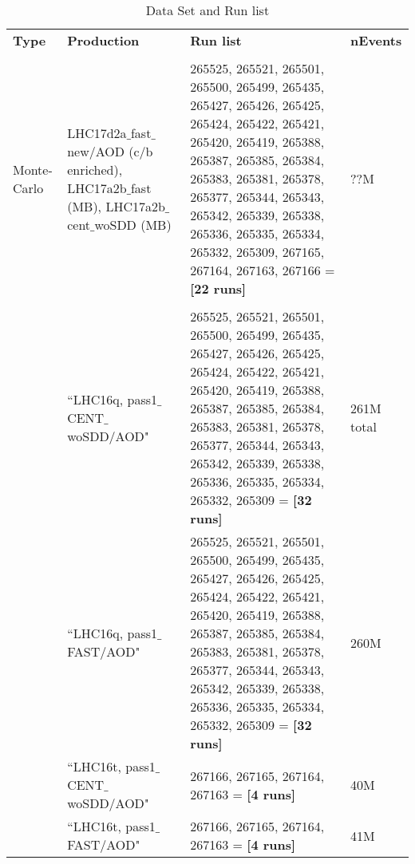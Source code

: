 \vspace{10 mm}
\begin{table}[h]
\begin{tabular}{ p{1.2cm} | p{4.2cm} |  p{7cm} |  p{1.2cm}}
{\normalsize \textbf {Type}} &       {\normalsize \textbf {Production}} &       {\normalsize \textbf {Run list}} & {\normalsize \textbf {nEvents}} \\
\\ \hline
Monte-Carlo & LHC17d2a$\_$fast$\_$new/AOD (c/b enriched), LHC17a2b$\_$fast (MB), LHC17a2b$\_$cent$\_$woSDD (MB) &265525, 265521, 265501, 265500, 265499, 265435, 265427, 265426, 265425, 265424, 265422, 265421, 265420, 265419, 265388, 265387, 265385, 265384, 265383, 265381, 265378, 265377, 265344, 265343, 265342, 265339, 265338, 265336, 265335, 265334, 265332, 265309, 267165, 267164, 267163, 267166 = \textbf{[22 runs]} & ??M\\
\\ \hline

\multirow{7}{*}{} Data&``LHC16q, pass1$\_$CENT$\_$woSDD/AOD" & 265525, 265521, 265501, 265500, 265499, 265435, 265427, 265426, 265425, 265424, 265422, 265421, 265420, 265419, 265388, 265387, 265385, 265384, 265383, 265381, 265378, 265377, 265344, 265343, 265342, 265339, 265338, 265336, 265335, 265334, 265332, 265309 = \textbf{[32 runs]}& 261M total\\
                  &``LHC16q, pass1$\_$FAST/AOD" &265525, 265521, 265501, 265500, 265499, 265435, 265427, 265426, 265425, 265424, 265422, 265421, 265420, 265419, 265388, 265387, 265385, 265384, 265383, 265381, 265378, 265377, 265344, 265343, 265342, 265339, 265338, 265336, 265335, 265334, 265332, 265309 = \textbf{[32 runs]} & 260M \\
 & ``LHC16t, pass1$\_$CENT$\_$woSDD/AOD" & 267166, 267165, 267164, 267163 = \textbf{[4 runs]} & 40M \\
  & ``LHC16t, pass1$\_$FAST/AOD" & 267166, 267165, 267164, 267163 = \textbf{[4 runs]} & 41M \\
 \hline \hline
\end{tabular}
\\
\caption {Data Set and Run list}
\end{table} 

